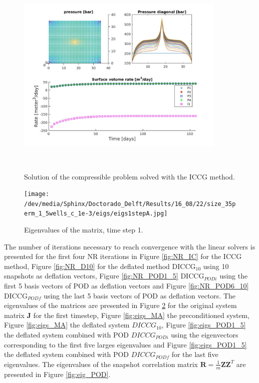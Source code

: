 \documentclass[12pt]{article}
\begin{document}
\begin{figure}[!h]
\centering
\begin{minipage}{.7\textwidth}
 \centering
\includegraphics[width=10cm,height=10cm,keepaspectratio]
{solutionIC.jpg}
\caption{Solution of the compressible problem solved with the ICCG method.}
\label{fig:compsol}
\end{minipage}
\end{figure}

\begin{figure}[!h]
\centering
\begin{minipage}{.6\textwidth}
 \centering
\texttt{[image: /dev/media/Sphinx/Doctorado\_Delft/Results/16\_08/22/size\_35perm\_1\_5wells\_c\_1e-3/eigs/eigs1stepA.jpg]}
\caption{Eigenvalues of the matrix, time step 1.}
\label{fig:eigs_A}
\end{minipage}
\end{figure}
The number of iterations necessary to reach convergence with the linear solvers is presented for the first four NR iterations in Figure \ref{fig:NR_IC} for the ICCG method, Figure \ref{fig:NR_D10} for the deflated method DICCG$_{10}$ using 10 snapshots as deflation vectors, Figure \ref{fig:NR_POD1_5} DICCG$_{PODi}$ using the first 5 basis vectors of POD as deflation vectors and Figure \ref{fig:NR_POD6_10} DICCG$_{PODf}$ using the last 5 basis vectors of POD as deflation vectors. 
The eigenvalues of the matrices are presented in Figure \ref{fig:eigs_A} for the original system matrix $\mathbf{J}$ for the first timestep, Figure \ref{fig:eigs_MA} the preconditioned system, Figure \ref{fig:eigs_MA} the deflated system $DICCG_{10}$, Figure \ref{fig:eigs_POD1_5} the deflated system combined with POD $DICCG_{PODi}$ using the eigenvectors corresponding to the first five larges eigenvalues and Figure \ref{fig:eigs_POD1_5} the deflated system combined with POD $DICCG_{PODf}$ for the last five eigenvalues. The eigenvalues of the snapshot correlation matrix $\mathbf{R}=\frac{1}{m}\mathbf{Z}\mathbf{Z}^T$ are presented in Figure \ref{fig:eig_POD}. 
\end{document}
